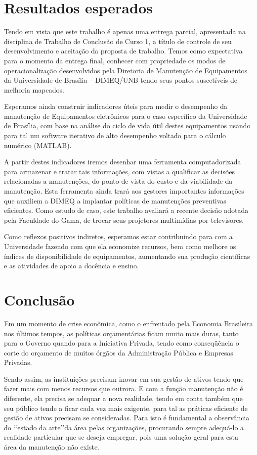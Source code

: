 \chapter{Resultados esperados}

Tendo em vista que este trabalho é apenas uma entrega parcial, apresentada na disciplina de Trabalho de Conclusão de Curso 1, a título de controle de seu desenvolvimento e aceitação da proposta de trabalho. Temos como expectativa para o momento da entrega final, conhecer com propriedade os modos de operacionalização desenvolvidos pela Diretoria de Manutenção de Equipamentos da Universidade de Brasília – DIMEQ/UNB tendo seus pontos suscetíveis de melhoria mapeados.

Esperamos ainda construir indicadores úteis para medir o desempenho da manutenção de Equipamentos eletrônicos para o caso específico da Universidade de Brasília, com base na análise do ciclo de vida útil destes equipamentos usando para tal um software iterativo de alto desempenho voltado para o cálculo numérico (MATLAB).

A partir destes indicadores iremos desenhar uma ferramenta computadorizada para armazenar e tratar tais informações, com vistas a qualificar as decisões relacionadas a manutenções, do ponto de vista do custo e da viabilidade da manutenção. Esta ferramenta ainda trará aos gestores importantes informações que auxiliem a DIMEQ a implantar políticas de manutenções preventivas eficientes. Como estudo de caso, este trabalho avaliará a recente decisão adotada pela Faculdade do Gama, de trocar seus projetores multimídias por televisores.

Como reflexos positivos indiretos, esperamos estar contribuindo para com a Universidade fazendo com que ela economize recursos, bem como melhore os índices de disponibilidade de equipamentos, aumentando sua produção científicas e as atividades de apoio a docência e ensino.

\chapter{Conclusão}

Em um momento de crise econômica, como o enfrentado pela Economia Brasileira nos últimos tempos, as políticas orçamentárias ficam muito mais duras, tanto para o Governo quando para a Iniciativa Privada, tendo como conseqüência o corte do orçamento de muitos órgãos da Administração Pública e Empresas Privadas.

Sendo assim, as instituições precisam inovar em sua gestão de ativos tendo que fazer mais com menos recursos que outrora. E com a função manutenção não é diferente, ela precisa se adequar a nova realidade, tendo em conta também que seu público tende a ficar cada vez mais exigente, para tal as práticas eficiente de gestão de ativos precisam se consideradas.
Para isto é fundamental a observância do \lq\lq estado da arte\rq\rq da área pelas organizações, procurando sempre adequá-lo a realidade particular que se deseja empregar, pois uma solução geral para esta área da manutenção não existe. 

